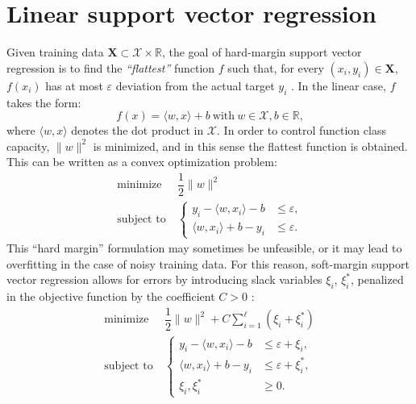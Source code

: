 \documentclass[12pt]{report}
\begin{document}
\section{Linear support vector regression}
Given training data $ \mathbf{X} \subset \mathcal{X} \times \mathbb{R} $, the goal of hard-margin support vector regression is to find the \textit{``flattest''} function $ f $ such that, for every $ (x_{i},y_{i}) \in \mathbf{X} $, $ f(x_{i}) $ has at most $ \varepsilon $ deviation from the actual target $ y_{i} $ \cite{vapnik95}. In the linear case, $ f $ takes the form:
\begin{equation} \label{linfun}
f(x) = \langle w,x \rangle + b \ \text{with} \ w \in \mathcal{X}, b \in \mathbb{R} \text{,}
\end{equation}
where $\langle w,x \rangle$ denotes the dot product in $\mathcal{X}$.
In order to control function class capacity, $ \| w \|^2 $ is minimized, and in this sense the flattest function is obtained. This can be written as a convex optimization problem:
\begin{equation} \label{hmargprimal}
\begin{split}
\text{minimize} &\ \dfrac{1}{2}\| w \|^2 \\
\text{subject to} &\ \begin{cases}
y_{i} - \langle w,x_{i} \rangle - b &\leq \varepsilon \text{,}\\
\langle w,x_{i} \rangle + b - y_{i} &\leq \varepsilon \text{.}
\end{cases}
\end{split}
\end{equation}
This ``hard margin'' formulation may sometimes be unfeasible, or it may lead to overfitting in the case of noisy training data. For this reason, soft-margin support vector regression allows for errors by introducing slack variables $ \xi_{i} $, $ \xi_{i}^{*} $, penalized in the objective function by the coefficient $ C > 0 $ \cite{cortes95}:
\begin{equation} \label{smargprimal}
\begin{split}
\text{minimize} &\ \dfrac{1}{2}\| w \|^2 + C\sum_{i=1}^{\ell}(\xi_{i} + \xi_{i}^{*}) \\
\text{subject to} &\ \begin{cases}
y_{i} - \langle w,x_{i} \rangle - b &\leq \varepsilon + \xi_{i} \text{,}\\
\langle w,x_{i} \rangle + b - y_{i} &\leq \varepsilon + \xi_{i}^{*} \text{,}\\
\xi_{i}, \xi_{i}^{*} &\geq 0 \text{.}
\end{cases}
\end{split}
\end{equation}
\end{document}
